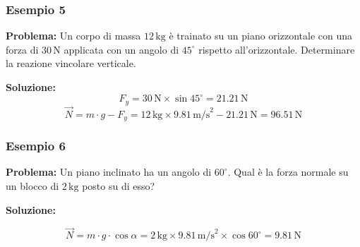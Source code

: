 \documentclass{beamer}
\begin{document}
\begin{frame}
\frametitle{Esempio 5}
\textbf{Problema:} Un corpo di massa $12\,\text{kg}$ è trainato su un piano orizzontale con una forza di $30\,\text{N}$ applicata con un angolo di $45^\circ$ rispetto all'orizzontale. Determinare la reazione vincolare verticale.

\textbf{Soluzione:}
\begin{equation*}
F_{y} = 30\,\text{N} \times \sin{45^\circ} = 21.21\,\text{N}
\end{equation*}
\begin{equation*}
\vec{N} = m \cdot g - F_{y} = 12\,\text{kg} \times 9.81\,\text{m/s}^2 - 21.21\,\text{N} = 96.51\,\text{N}
\end{equation*}
\end{frame}

\begin{frame}
\frametitle{Esempio 6}
\textbf{Problema:} Un piano inclinato ha un angolo di $60^\circ$. Qual è la forza normale su un blocco di $2\,\text{kg}$ posto su di esso?

\textbf{Soluzione:}

\begin{equation*}
\vec{N} = m \cdot g \cdot \cos{\alpha} = 2\,\text{kg} \times 9.81\,\text{m/s}^2 \times \cos{60^\circ} = 9.81\,\text{N}
\end{equation*}
\end{frame}
\end{document}
